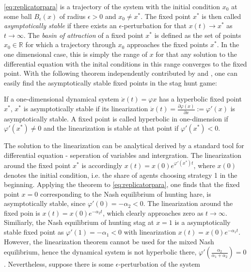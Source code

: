 \documentclass[11pt]{article}
\newcommand{\realnumb}{\mathbb{R}}
\begin{document}
\eqref{eq:replicatorpara} is a trajectory of the system with the initial
condition $x_0$ at some ball $B_\epsilon(x)$ of radius $\epsilon >0$ and 
$x_0 \neq x^*$. The fixed point $x^*$ is then called \textit{asymptotically
stable} if there exists an $\epsilon$-perturbation for that $x(t) \rightarrow
x^*$ as $t \rightarrow \infty$. 
The \textit{basin of attraction} of a fixed point $x^*$ is defined as the set 
of points $x_0 \in \realnumb$ for which a trajectory through $x_0$ approaches 
the fixed points $x^*$. In the one dimensional case, this is simply the range 
of $x$ for that any solution to the differential equation with the inital 
conditions in this range converges to the fixed point. With the following 
theorem independently contributed by \cite{hartman_lemma_1960} and 
\cite{grobman_homeomorphism_1959}, one can easily 
find the asymptotically stable fixed points in the stag hunt game:
\begin{mydef}
        If a one-dimensional dynamical system $\dot{x}(t) = \varphi{x}$ 
        has a hyperbolic fixed point $x^*$, $x^*$ is asymptotically stable
        if its linearization 
        $\dot{x}(t) = \frac{\partial\varphi(x)}{\partial x} := \varphi'(x)$ 
        is asymptotically stable. 
        A fixed point is called hyperbolic in one-dimension if 
        $\varphi'(x^*) \neq 0$ and the linearization is stable at that
        point if $\varphi'(x^*) < 0$.
\end{mydef}
The solution to the linearization can be analytical derived by 
a standard tool for differential equation - seperation of variables and 
intergration.
The linearization around the fixed point $x^*$ is accordingly
$x(t)= x(0) e^{\varphi'(x^*)t}$, where $x(0)$ denotes the 
initial condition, i.e. the share of agents choosing strategy 1 in the 
beginning.
Applying the theorem to \eqref{eq:replicatorpara}, one finds that the 
fixed point $x=0$ corresponding to the Nash equilibrium of hunting hare, is 
asymptotically stable, since $\varphi'(0) = - \alpha_2 <0$. 
The linearization around the fixed poin is $x(t) = x(0) e^{-\alpha_2 t}$, 
which clearly approaches zero as $t \rightarrow \infty$. 
Similiarly, the Nash equilibrium 
of hunting stag at $x=1$ is a asymptotically stable fixed point as
$\varphi'(1) = -\alpha_1 <0$ with linearization $x(t) = x(0) e^{-\alpha_1 t}$.
However, the linearization theorem cannot be used for the mixed Nash 
equilibrium, hence the dynamical system is not hyperbolic there, 
$\varphi'(\frac{\alpha_2}{\alpha_1+\alpha_2}) = 0$. Nevertheless, suppose 
there is some $\epsilon$-perturbation of the system  
\end{document}
